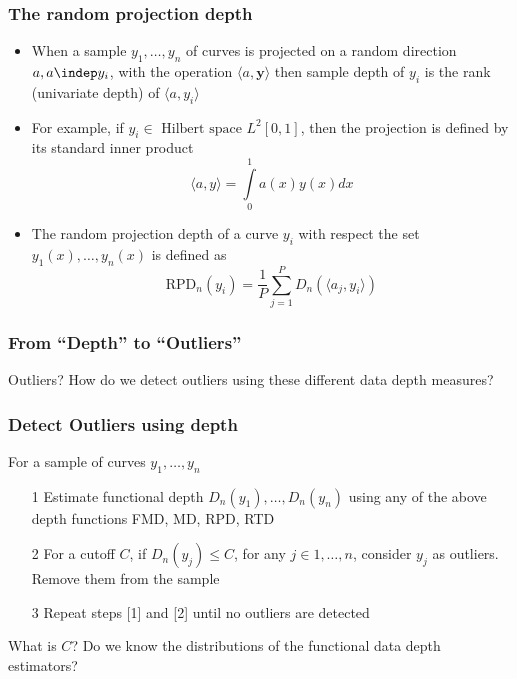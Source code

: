 \documentclass[10pt,dvipsnames,table]{beamer}
\begin{document}
\begin{frame}
\frametitle{The random projection depth}
\begin{itemize}
\item When a sample $y_1, \dots, y_n$ of curves is projected on a random direction $a, a \indep y_i$, with the operation $ \langle a, \mathbf{y} \rangle$ then sample depth of $y_i$ is the rank (univariate depth) of $ \langle a, y_i \rangle$
\pause
\item For example, if $y_i \in \text{ Hilbert space } L^2[0,1]$, then the projection is defined by its standard inner product 
\[ \langle a, y \rangle = \int\limits_0^1 a(x) y(x) dx\]
\pause
\item The random projection depth of a curve $y_i$ with respect the set $y_1(x), \dots , y_n(x)$ is defined as
\[ \text{RPD}_n(y_i) = \frac{1}{P} \sum\limits_{j = 1}^P D_n(\langle a_j, y_i \rangle)\]
\end{itemize}
\end{frame}

%

\begin{frame}
\frametitle{From ``Depth'' to ``Outliers''}
\Large
\begin{block}{Outliers?}
How do we detect outliers using these different data depth measures?
\end{block}
\end{frame}

\begin{frame}
\frametitle{Detect Outliers using depth}
For a sample of curves $y_1, \dots , y_n$
\begin{enumerate}
\item[1] Estimate functional depth $D_n(y_1), \dots , D_n(y_n)$ using any of the above depth functions FMD, MD, RPD, RTD
\item[2] For a cutoff $C$, if $D_n(y_j) \leq C$, for any $j \in 1, \dots, n$, consider $y_j$ as outliers. Remove them from the sample
\item[3] Repeat steps [1] and [2] until no outliers are detected
\end{enumerate}
\vspace{1cm}
\pause
\begin{block}{What is $C$?}
Do we know the distributions of the functional data depth estimators?
\end{block}

\end{frame}
\end{document}
